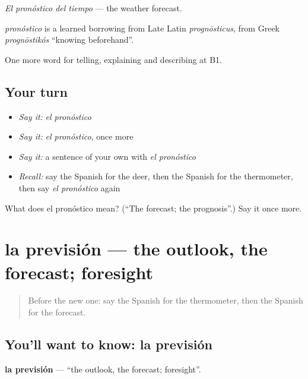 \emph{El pronóstico del tiempo} — the weather forecast.

\begin{cousinweb}
\emph{pronóstico} is a learned borrowing from Late Latin \emph{prognōsticus}, from Greek \emph{prognōstikós} \textquotedblleft{}knowing beforehand\textquotedblright{}.
\end{cousinweb}

\begin{grammarlens}[title={What you've built}]
One more word for telling, explaining and describing at B1.
\end{grammarlens}

\subsection*{Your turn}
\begin{itemize}
\raggedright
  \item \emph{Say it:} \emph{el pronóstico}
  \item \emph{Say it:} \emph{el pronóstico}, once more
  \item \emph{Say it:} a sentence of your own with \emph{el pronóstico}
  \item \emph{Recall:} say the Spanish for the deer, then the Spanish for the thermometer, then say \emph{el pronóstico} again
\end{itemize}

\begin{tcolorbox}[breakable,colback=teal!4,colframe=teal!35!black,title={Before you move on}]
What does el pronóstico mean? (\textquotedblleft{}The forecast; the prognosis\textquotedblright{}.) Say it once more.
\end{tcolorbox}
\section[la previsión]{la previsión — the outlook, the forecast; foresight}

\label{lesson:ES-C696-prevision}



\begin{quote}
Before the new one: say the Spanish for the thermometer, then the Spanish for the forecast.
\end{quote}

\subsection*{You'll want to know: la previsión}
\textbf{la previsión} — \textquotedblleft{}the outlook, the forecast; foresight\textquotedblright{}.

